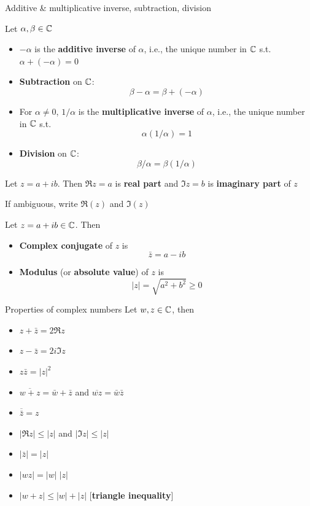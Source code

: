 \documentclass[aspectratio=169]{beamer}
\begin{document}
\begin{frame}{Additive \& multiplicative inverse, subtraction, division}
	\begin{definition}
		Let $\alpha,\beta\in\mathbb{C}$
		\begin{itemize}
			\item $-\alpha$ is the \textbf{additive inverse} of $\alpha$, i.e., the unique number in $\mathbb{C}$ s.t. $\alpha+(-\alpha)=0$
			\item \textbf{Subtraction} on $\mathbb{C}$:
			\[
			\beta-\alpha=\beta+(-\alpha)
			\]
			\item For $\alpha\neq 0$, $1/\alpha$ is the \textbf{multiplicative inverse} of $\alpha$, i.e., the unique number in $\mathbb{C}$ s.t.
			\[
			\alpha(1/\alpha)=1
			\]
			\item \textbf{Division} on $\mathbb{C}$:
			\[
			\beta/\alpha=\beta(1/\alpha)
			\]
		\end{itemize}
	\end{definition}
\end{frame}


\begin{frame}
	\begin{definition}
		Let $z=a+ib$. Then $\Re z=a$ is \textbf{real part} and $\Im z=b$ is \textbf{imaginary part} of $z$
	\end{definition}
	\vfill
	If ambiguous, write $\Re(z)$ and $\Im(z)$
	\vfill
	\begin{definition}
		Let $z=a+ib\in\mathbb{C}$. Then
		\begin{itemize}
			\item \textbf{Complex conjugate} of $z$ is
			\[
			\bar z = a-ib
			\]
			\item \textbf{Modulus} (or \textbf{absolute value}) of $z$ is
			\[
			|z|=\sqrt{a^2+b^2} \geq 0
			\]
		\end{itemize}
	\end{definition}
\end{frame}

\begin{frame}{Properties of complex numbers}
	Let $w,z\in\mathbb{C}$, then
	\begin{itemize}
		\item $z+\bar z=2\Re z$
		\item $z-\bar z=2i\Im z$
		\item $z\bar z=|z|^2$
		\item $\overline{w+z}=\bar w+\bar z$ and $\overline{wz}=\bar w\bar z$
		\item $\overline{\bar z}=z$
		\item $|\Re z|\leq |z|$ and $|\Im z|\leq |z|$
		\item $|\bar z|=|z|$
		\item $|wz|=|w|\;|z|$
		\item $|w+z|\leq |w|+|z|$ \hfill[\textbf{triangle inequality}]
	\end{itemize}
\end{frame}
\end{document}
